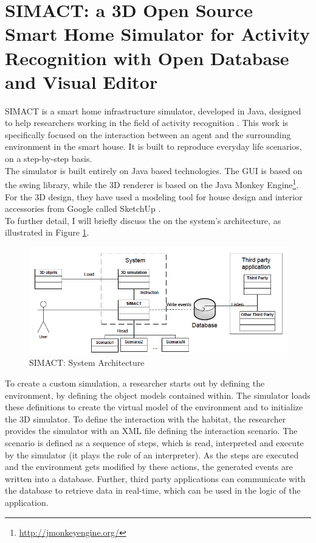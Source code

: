 \section{SIMACT: a 3D Open Source Smart Home Simulator for Activity Recognition with Open Database and Visual Editor}\label{sec:simact}

SIMACT is a smart home infrastructure simulator, developed in Java, designed to help researchers working in the field of activity recognition \cite{bouchard2012simact}. This work is specifically focused on the interaction between an agent and the surrounding environment in the smart house. It is built to reproduce everyday life scenarios, on a step-by-step basis.\\

The simulator is built entirely on Java based technologies. The GUI is based on the swing library, while the 3D renderer is based on the Java Monkey Engine\footnote{\url{http://jmonkeyengine.org/}}. For the 3D design, they have used a modeling tool for house design and interior accessories from Google called SketchUp \cite{sketchup:online}.\\

To further detail, I will briefly discuss the on the system's architecture, as illustrated in Figure \ref{fig:simact_architecture}.

\begin{figure}[H]
	\centering
	\includegraphics[width=\linewidth]{gfx/Chapter2/simact_architecture}
	\caption{SIMACT: System Architecture}
	\label{fig:simact_architecture}
\end{figure}

To create a custom simulation, a researcher starts out by defining the environment, by defining the object models contained within. The simulator loads these definitions to create the virtual model of the environment and to initialize the 3D simulator. To define the interaction with the habitat, the researcher provides the simulator with an XML file defining the interaction scenario. The scenario is defined as a sequence of steps, which is read, interpreted and execute by the simulator (it plays the role of an interpreter). As the steps are executed and the environment gets modified by these actions, the generated events are written into a database. Further, third party applications can communicate with the database to retrieve data in real-time, which can be used in the logic of the application.\\


